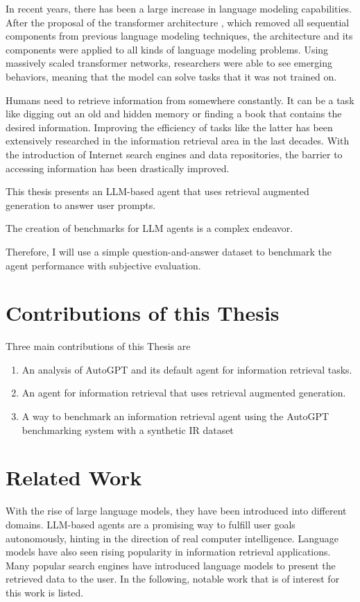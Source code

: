 \documentclass[../main.tex]{subfiles}
\begin{document}
In recent years, there has been a large increase in language modeling capabilities.
After the proposal of the transformer architecture \cite{Vaswani2017},
which removed all sequential components from previous language modeling techniques,
the architecture and its components were applied to all kinds of language modeling problems.
Using massively scaled transformer networks, researchers were able to
see emerging behaviors, meaning that the model can solve tasks that it was not trained on.

Humans need to retrieve information from somewhere constantly.
It can be a task like digging out an old and hidden memory or finding a book that contains the desired information.
Improving the efficiency of tasks like the latter has been extensively researched in the information retrieval area in the last decades.
With the introduction of Internet search engines and data repositories, the barrier to accessing information has been drastically improved.

This thesis presents an LLM-based agent that uses retrieval augmented generation to answer user prompts.

The creation of benchmarks for LLM agents is a complex endeavor.

Therefore, I will use a simple question-and-answer dataset to benchmark the agent performance with subjective evaluation.

\section{Contributions of this Thesis}

Three main contributions of this Thesis are

\begin{enumerate}
    \item An analysis of AutoGPT and its default agent for information retrieval tasks.
    \item An agent for information retrieval that uses retrieval augmented generation.
    \item A way to benchmark an information retrieval agent using the AutoGPT benchmarking system with a synthetic IR dataset
\end{enumerate}

\section{Related Work}

With the rise of large language models, they have been introduced into different domains.
LLM-based agents are a promising way to fulfill user goals autonomously,
hinting in the direction of real computer intelligence.
Language models have also seen rising popularity in information retrieval applications.
Many popular search engines have introduced language models to present the retrieved data to the user.
In the following, notable work that is of interest for this work is listed.
\end{document}

